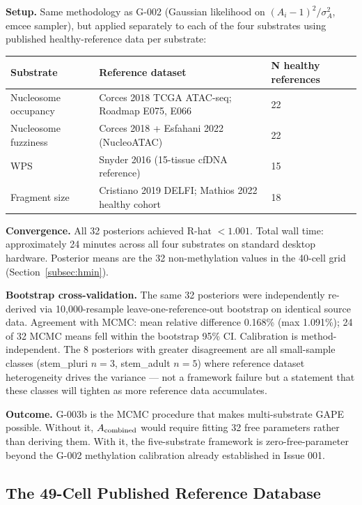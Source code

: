 \documentclass[12pt,a4paper]{article}
\begin{document}
\textbf{Setup.} Same methodology as G-002 (Gaussian likelihood on
$(A_i - 1)^2/\sigma_A^2$, emcee sampler), but applied separately to each of
the four substrates using published healthy-reference data per substrate:

\begin{center}
\renewcommand{\arraystretch}{1.2}
\begin{tabular}{lll}
\toprule
\textbf{Substrate} & \textbf{Reference dataset} & \textbf{N healthy references} \\
\midrule
Nucleosome occupancy & Corces 2018 TCGA ATAC-seq; Roadmap E075, E066 & 22 \\
Nucleosome fuzziness & Corces 2018 + Esfahani 2022 (NucleoATAC) & 22 \\
WPS & Snyder 2016 (15-tissue cfDNA reference) & 15 \\
Fragment size & Cristiano 2019 DELFI; Mathios 2022 healthy cohort & 18 \\
\bottomrule
\end{tabular}
\end{center}

\textbf{Convergence.} All 32 posteriors achieved R-hat $< 1.001$. Total wall
time: approximately 24 minutes across all four substrates on standard desktop
hardware. Posterior means are the 32 non-methylation values in the 40-cell
grid (Section~\ref{subsec:hmin}).

\textbf{Bootstrap cross-validation.} The same 32 posteriors were independently
re-derived via 10{,}000-resample leave-one-reference-out bootstrap on identical
source data. Agreement with MCMC: mean relative difference 0.168\%
(max 1.091\%); 24 of 32 MCMC means fell within the bootstrap 95\% CI.
Calibration is method-independent. The 8 posteriors with greater disagreement
are all small-sample classes (stem\_pluri $n = 3$, stem\_adult $n = 5$) where
reference dataset heterogeneity drives the variance --- not a framework failure
but a statement that these classes will tighten as more reference data
accumulates.

\textbf{Outcome.} G-003b is the MCMC procedure that makes multi-substrate
GAPE possible. Without it, $A_{\rm combined}$ would require fitting 32 free
parameters rather than deriving them. With it, the five-substrate framework
is zero-free-parameter beyond the G-002 methylation calibration already
established in Issue 001.

\subsection{The 49-Cell Published Reference Database}
\label{subsec:db49}
\end{document}
